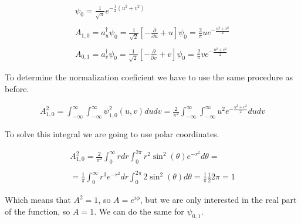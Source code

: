 \begin{equation}
  \begin{array}{c}
    \psi_0 = \frac{1}{\sqrt{\pi}} e^{-\frac{1}{2}(u^2+v^2)}
    \\

    \\
    A_{1,0} = a_u^{\dagger} \psi_0 = \frac{1}{\sqrt{2}}\left[-\frac{\partial}{\partial u}+u\right]\psi_0 = \frac{2}{\pi} u e^{-\frac{u^2+v^2}{2}}
    \\

    \\
    A_{0,1} = a_v^{\dagger} \psi_0 = \frac{1}{\sqrt{2}}\left[-\frac{\partial}{\partial v}+v\right]\psi_0 = \frac{2}{\pi} v e^{-\frac{u^2+v^2}{2}}
  \end{array}
\end{equation}

To determine the normalization coeficient we have to use the same procedure as before.

\begin{equation}
  \begin{array}{c}
    A^2_{1,0} = \int_{-\infty}^{\infty}\int_{-\infty}^{\infty} \psi_{1,0}^2(u,v) du dv = \frac{2}{\pi^2} \int_{-\infty}^{\infty}\int_{-\infty}^{\infty} u^2 e^{-\frac{u^2+v^2}{2}} du dv
  \end{array}
\end{equation}

To solve this integral we are going to use polar coordinates.

\begin{equation}
  \begin{array}{c}
    A^2_{1,0} = \frac{2}{\pi^2} \int_{0}^{\infty} rdr \int_{0}^{2\pi} r^2 \sin^2(\theta) e^{-r^2} d\theta =
    \\

    \\
    = \frac{1}{\pi} \int_{0}^{\infty} r^3 e^{-r^2} dr \int_{0}^{2\pi} 2\sin^2(\theta) d\theta = \frac{1}{\pi} \frac{1}{2} 2\pi = 1
  \end{array}
\end{equation}

Which means that $A^2 = 1$, so $A = e^{i\phi}$, but we are only interested in the real part of the function, so $A = 1$. We can do the same for $\psi_{0,1}$.


